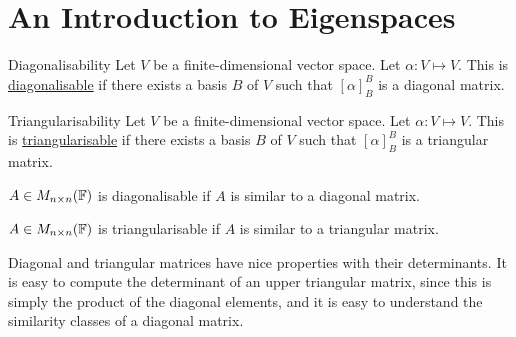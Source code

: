 \documentclass[../Main.tex]{subfiles}
\begin{document}
\section{An Introduction to Eigenspaces}
\begin{definition}{Diagonalisability}
    Let $V$ be a finite-dimensional vector space. Let $\alpha : V \mapsto V$. This is \underline{diagonalisable} if there exists a basis $B$ of $V$ such that $[\alpha]_B^B$ is a diagonal matrix.
\end{definition}
\begin{definition}{Triangularisability}
    Let $V$ be a finite-dimensional vector space. Let $\alpha : V \mapsto V$. This is \underline{triangularisable} if there exists a basis $B$ of $V$ such that $[\alpha]_B^B$ is a triangular matrix.
\end{definition}
\begin{remarks}
    \item $A \in M_{n \times n}(\mathbb{F})$ is diagonalisable if $A$ is similar to a diagonal matrix.
    \item $A \in M_{n \times n}(\mathbb{F})$ is triangularisable if $A$ is similar to a triangular matrix.
\end{remarks}
Diagonal and triangular matrices have nice properties with their determinants. It is easy to compute the determinant of an upper triangular matrix, since this is simply the product of the diagonal elements, and it is easy to understand the similarity classes of a diagonal matrix.
\end{document}

